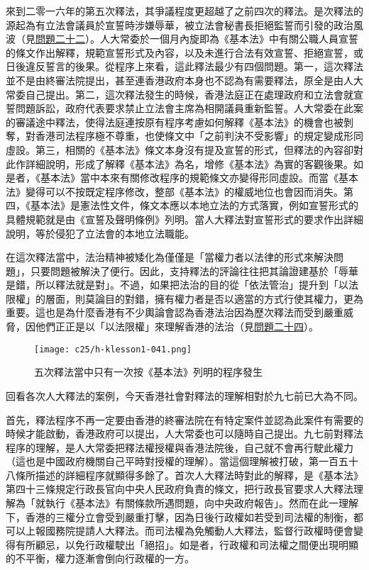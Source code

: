 來到二零一六年的第五次釋法，其爭議程度更超越了之前四次的釋法。是次釋法的源起為有立法會議員於宣誓時涉嫌辱華，被立法會秘書長拒絕監誓而引發的政治風波（見\hyperref[sec:sec22]{問題二十二}）。人大常委於一個月內旋即為《基本法》中有關公職人員宣誓的條文作出解釋，規範宣誓形式及內容，以及未進行合法有效宣誓、拒絕宣誓，或日後違反誓言的後果。從程序上來看，這此釋法最少有四個問題。第一，這次釋法並不是由終審法院提出，甚至連香港政府本身也不認為有需要釋法，原全是由人大常委自己提出。第二，這次釋法發生的時候，香港法庭正在處理政府和立法會就宣誓問題訴訟，政府代表要求禁止立法會主席為相開議員重新監誓。人大常委在此案的審議途中釋法，使得法庭連按原有程序考慮如何解釋《基本法》的機會也被剝奪，對香港司法程序極不尊重，也使條文中「之前判決不受影響」的規定變成形同虛設。第三，相關的《基本法》條文本身沒有提及宣誓的形式，但釋法的內容卻對此作詳細說明，形成了解釋《基本法》為名，增修《基本法》為實的客觀後果。如是者，《基本法》當中本來有關修改程序的規範條文亦變得形同虛設。而當《基本法》變得可以不按既定程序修改，整部《基本法》的權威地位也會因而消失。第四，《基本法》是憲法性文件，條文本應以本地立法的方式落實，例如宣誓形式的具體規範就是由《宣誓及聲明條例》列明。當人大釋法對宣誓形式的要求作出詳細說明，等於侵犯了立法會的本地立法職能。

在這次釋法當中，法治精神被矮化為僅僅是「當權力者以法律的形式來解決問題」，只要問題被解決了便行。因此，支持釋法的評論往往把其論證建基於「辱華是錯，所以釋法就是對」。不過，如果把法治的目的從「依法管治」提升到「以法限權」的層面，則莫論目的對錯，擁有權力者是否以適當的方式行使其權力，更為重要。這也是為什麼香港有不少輿論會認為香港法治因為歷次釋法而受到嚴重威脅，因他們正正是以「以法限權」來理解香港的法治（見\hyperref[sec:sec24]{問題二十四}）。

\begin{figure}[htbp]
    \centering
    \texttt{[image: c25/h-klesson1-041.png]}
    \caption{五次釋法當中只有一次按《基本法》列明的程序發生}
\end{figure}

回看各次人大釋法的案例，今天香港社會對釋法的理解相對於九七前已大為不同。

首先，釋法程序不再一定要由香港的終審法院在有特定案件並認為此案件有需要的時候才能啟動，香港政府可以提出，人大常委也可以隨時自己提出。九七前對釋法程序的理解，是人大常委把釋法權授權與香港法院後，自己就不會再行駛此權力（這也是中國政府機關自己平時對授權的理解）。當這個理解被打破，第一百五十八條所描述的詳細程序就顯得多餘了。首次人大釋法時對此的解釋，是《基本法》第四十三條規定行政長官向中央人民政府負責的條文，把行政長官要求人大釋法理解為「就執行《基本法》有關條款所遇問題，向中央政府報告」。然而在此一理解下，香港的三權分立會受到嚴重打擊，因為日後行政權如若受到司法權的制衡，都可以上報國務院提請人大釋法。而司法權為免觸動人大釋法，監督行政權時便會變得有所顧忌，以免行政權駛出「絕招」。如是者，行政權和司法權之間便出現明顯的不平衡，權力逐漸會倒向行政權的一方。

